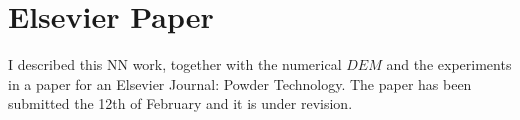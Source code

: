 
\section{Elsevier Paper}
\label{sec:elsevierpaper}

I described this NN work, together with the numerical $DEM$ and the experiments
in a paper for an Elsevier Journal: Powder Technology.
The paper has been submitted the 12th of February and it is under revision.\\